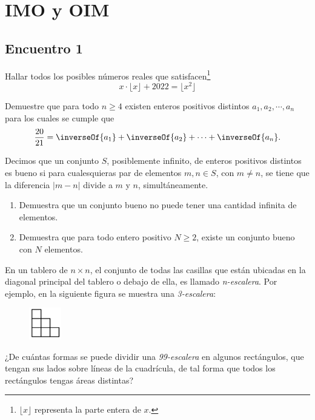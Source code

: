 \section{IMO y OIM}

\subsection{Encuentro 1}

\begin{section-problem}
    Hallar todos los posibles números reales que satisfacen\footnote{$\lfloor x \rfloor$ representa la parte entera de $x$.}
    \[x\cdot\lfloor x \rfloor + 2022 = \lfloor x^2 \rfloor\]
\end{section-problem}

\begin{section-problem}
    Demuestre que para todo $n \geq 4$ existen enteros positivos distintos $a_1, a_2, \cdots, a_n$ para los cuales se cumple que
    \[\frac{20}{21} = \inverseOf{a_1} + \inverseOf{a_2} + \cdots + \inverseOf{a_n}.\]
\end{section-problem}

\begin{section-problem}
    Decimos que un conjunto $S$, posiblemente infinito, de enteros positivos distintos es bueno si para cualesquieras par de elementos $m, n \in S$, con $m \neq n$, se tiene que la diferencia $|m - n|$ divide a $m$ y $n$, simultáneamente.
    \begin{enumerate}
        \item Demuestra que un conjunto bueno no puede tener una cantidad infinita de elementos.
        \item Demuestra que para todo entero positivo $N \geq 2$, existe un conjunto bueno con $N$ elementos.
    \end{enumerate}
\end{section-problem}

\begin{section-problem}
    En un tablero de $n \times n$, el conjunto de todas las casillas que están ubicadas en la diagonal principal del tablero o debajo de ella, es llamado \textit{n-escalera}.
    Por ejemplo, en la siguiente figura se muestra una \textit{3-escalera}:
    \begin{figure}[htb]
        \centering
        \includegraphics[width=1.4cm]{images/3-escalera}
    \end{figure}
    
    ¿De cuántas formas se puede dividir una \textit{99-escalera} en algunos rectángulos, que tengan sus lados sobre líneas de la cuadrícula, de tal forma que todos los rectángulos tengas áreas distintas?
\end{section-problem}

